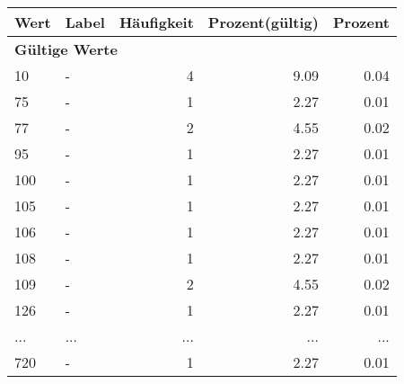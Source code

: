      \begin{longtable}{lXrrr}
     \toprule
     \textbf{Wert} & \textbf{Label} & \textbf{Häufigkeit} & \textbf{Prozent(gültig)} & \textbf{Prozent} \\
     \endhead
     \midrule
     \multicolumn{5}{l}{\textbf{Gültige Werte}}\\
        10 & \multicolumn{1}{X}{-} & %
          \num{4} &
          \num[round-mode=places,round-precision=2]{9.09} &
          \num[round-mode=places,round-precision=2]{0.04} \\
        75 & \multicolumn{1}{X}{-} & %
          \num{1} &
          \num[round-mode=places,round-precision=2]{2.27} &
          \num[round-mode=places,round-precision=2]{0.01} \\
        77 & \multicolumn{1}{X}{-} & %
          \num{2} &
          \num[round-mode=places,round-precision=2]{4.55} &
          \num[round-mode=places,round-precision=2]{0.02} \\
        95 & \multicolumn{1}{X}{-} & %
          \num{1} &
          \num[round-mode=places,round-precision=2]{2.27} &
          \num[round-mode=places,round-precision=2]{0.01} \\
        100 & \multicolumn{1}{X}{-} & %
          \num{1} &
          \num[round-mode=places,round-precision=2]{2.27} &
          \num[round-mode=places,round-precision=2]{0.01} \\
        105 & \multicolumn{1}{X}{-} & %
          \num{1} &
          \num[round-mode=places,round-precision=2]{2.27} &
          \num[round-mode=places,round-precision=2]{0.01} \\
        106 & \multicolumn{1}{X}{-} & %
          \num{1} &
          \num[round-mode=places,round-precision=2]{2.27} &
          \num[round-mode=places,round-precision=2]{0.01} \\
        108 & \multicolumn{1}{X}{-} & %
          \num{1} &
          \num[round-mode=places,round-precision=2]{2.27} &
          \num[round-mode=places,round-precision=2]{0.01} \\
        109 & \multicolumn{1}{X}{-} & %
          \num{2} &
          \num[round-mode=places,round-precision=2]{4.55} &
          \num[round-mode=places,round-precision=2]{0.02} \\
        126 & \multicolumn{1}{X}{-} & %
          \num{1} &
          \num[round-mode=places,round-precision=2]{2.27} &
          \num[round-mode=places,round-precision=2]{0.01} \\
       ... & ... & ... & ... & ... \\
        720 & \multicolumn{1}{X}{-} & %
          \num{1} &
          \num[round-mode=places,round-precision=2]{2.27} &
          \num[round-mode=places,round-precision=2]{0.01} \\


\end{longtable}
